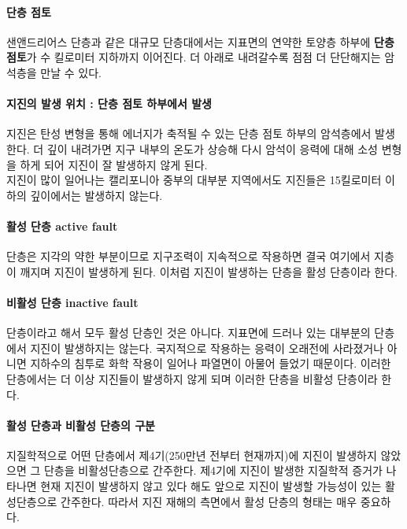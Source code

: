 \documentclass[12pt, a4paper, oneside]{book}
\begin{document}
		\paragraph{단층 점토}
		샌앤드리어스 단층과 같은 대규모 단층대에서는 
		지표면의 연약한 토양층 하부에 \textbf{단층 점토}가 수 킬로미터 지하까지 이어진다.
		더 아래로 내려갈수록 점점 더 단단해지는 암석층을 만날 수 있다.\\
		
		\paragraph{지진의 발생 위치 : 단층 점토 하부에서 발생 }
		지진은 탄성 변형을 통해 에너지가 축적될 수 있는 단층 점토 하부의 암석층에서 발생한다. 
		더 깊이 내려가면 지구 내부의 온도가 상승해 
		다시 암석이 응력에 대해 소성 변형을 하게 되어 지진이 잘 발생하지 않게 된다.\\
		
		지진이 많이 일어나는 캘리포니아 중부의 대부분 지역에서도 
		지진들은 15킬로미터 이하의 깊이에서는 발생하지 않는다.
		
		\paragraph{활성 단층 active fault}
		단층은 지각의 약한 부분이므로 
		지구조력이 지속적으로 작용하면 결국 여기에서 지층이 깨지며 지진이 발생하게 된다.
		이처럼 지진이 발생하는 단층을 활성 단층이라 한다.
		
		\paragraph{비활성 단층 inactive fault}
		단층이라고 해서 모두 활성 단층인 것은 아니다.
		지표면에 드러나 있는 대부분의 단층에서 지진이 발생하지는 않는다.
		국지적으로 작용하는 응력이 오래전에 사라졌거나 
		아니면 지하수의 침투로 화학 작용이 일어나 파열면이 아물어 들었기 때문이다.
		이러한 단층에서는 더 이상 지진들이 발생하지 않게 되며 이러한 단층을 비활성 단층이라 한다.
		
		\paragraph{활성 단층과 비활성 단층의 구분}
		지질학적으로 어떤 단층에서 제4기(250만년 전부터 현재까지)에 지진이 발생하지 않았으면 
		그 단층을 비활성단층으로 간주한다.
		제4기에 지진이 발생한 지질학적 증거가 나타나면 현재 지진이 발생하지 않고 있다 해도 앞으로 지진이 발생할 가능성이 있는 활성단층으로 간주한다.
		따라서 지진 재해의 측면에서 활성 단층의 형태는 매우 중요하다.
		
\end{document}
